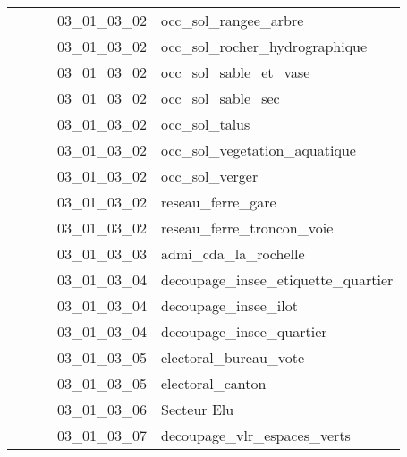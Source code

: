 \documentclass[12pt,titlepage]{book}
\begin{document}
\begin{supertabular}{|p{7.5cm}|p{7.5cm}|p{7.5cm}|c|p{10cm}|}
                   &                    &                    & 03\_01\_03\_02 & occ\_sol\_rangee\_arbre\\
                   &                    &                    & 03\_01\_03\_02 & occ\_sol\_rocher\_hydrographique\\
                   &                    &                    & 03\_01\_03\_02 & occ\_sol\_sable\_et\_vase\\
                   &                    &                    & 03\_01\_03\_02 & occ\_sol\_sable\_sec\\
                   &                    &                    & 03\_01\_03\_02 & occ\_sol\_talus\\
                   &                    &                    & 03\_01\_03\_02 & occ\_sol\_vegetation\_aquatique\\
                   &                    &                    & 03\_01\_03\_02 & occ\_sol\_verger\\
                   &                    &                    & 03\_01\_03\_02 & reseau\_ferre\_gare\\
                   &                    &                    & 03\_01\_03\_02 & reseau\_ferre\_troncon\_voie\\
                   &                    &                    & 03\_01\_03\_03 & admi\_cda\_la\_rochelle\\
                   &                    &                    & 03\_01\_03\_04 & decoupage\_insee\_etiquette\_quartier\\
                   &                    &                    & 03\_01\_03\_04 & decoupage\_insee\_ilot\\
                   &                    &                    & 03\_01\_03\_04 & decoupage\_insee\_quartier\\
                   &                    &                    & 03\_01\_03\_05 & electoral\_bureau\_vote\\
                   &                    &                    & 03\_01\_03\_05 & electoral\_canton\\
                   &                    &                    & 03\_01\_03\_06 & Secteur Elu\\
                   &                    &                    & 03\_01\_03\_07 & decoupage\_vlr\_espaces\_verts\\

\end{supertabular}
\end{document}
